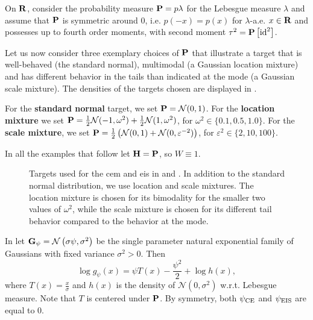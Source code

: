 \begin{example}
    \label{ex:symmetric-targets}
    On $\R$, consider the probability measure $\P = p\lambda$ for the Lebesgue measure $\lambda$ and assume that $\P$ is symmetric around $0$, i.e. $p(-x) = p(x)$ for $\lambda$-a.e. $x\in\R$ and possesses up to fourth order moments, with second moment $\tau^{2} = \P \left[\operatorname{id}^{2}\right]$.

    Let us now consider three exemplary choices of $\P$ that illustrate a target that is well-behaved (the standard normal), multimodal (a Gaussian location mixture) and has different behavior in the tails than indicated at the mode (a Gaussian scale mixture). The densities of the targets chosen are displayed in .

    For the \textbf{standard normal} target, we set $\P = \mathcal N(0,1)$. For the \textbf{location mixture} we set $\P = \frac{1}{2} \mathcal N(-1, \omega^{2}) + \frac{1}{2}\mathcal N(1, \omega^{2})$, for $\omega^{2} \in \{0.1, 0.5, 1.0 \}$. For the \textbf{scale mixture}, we set $\P = \frac{1}{2} \left( \mathcal N(0, 1) + \mathcal N(0, \varepsilon^{-2}) \right)$, for $\varepsilon^{2} \in \{2, 10, 100 \}$.

    In all the examples that follow let $\H=\P$, so $W\equiv1$.
    \begin{figure}
        \centering

        \resizebox{\textwidth}{!}{%
        }
        \caption{Targets used for the \gls{cem} and \gls{eis} in  and . In addition to the standard normal distribution, we use location and scale mixtures. The location mixture is chosen for its bimodality for the smaller two values of $\omega^{2}$, while the scale mixture is chosen for its different tail behavior compared to the behavior at the mode.}
        \label{fig:targets}
    \end{figure}

\end{example}

\begin{example}
    \label{ex:univ-gaussian-s2-fixed}
    In  let $\G_{\psi} = \mathcal N \left( \sigma\psi, \sigma^{2} \right)$ be the single parameter natural exponential family of Gaussians with fixed variance $\sigma^{2} > 0$. Then 
    $$
    \log g_{\psi}(x) = \psi T(x) - \frac{\psi^{2}}{2} + \log h(x),
    $$
    where $T(x) = \frac{x}{\sigma}$ and $h(x)$ is the density of $\mathcal N(0, \sigma^{2})$ w.r.t. Lebesgue measure. 
    Note that $T$ is centered under $\P$. By symmetry, both $\pce$ and $\peis$ are equal to $0$. 

\end{example}


